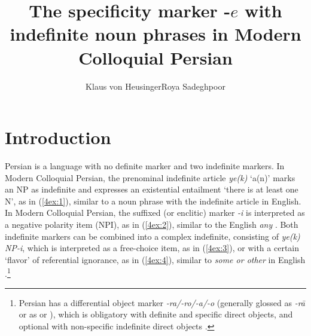 \documentclass[output=paper]{langsci/langscibook}
\author{Klaus von Heusinger\affiliation{Universität zu Köln}\lastand Roya Sadeghpoor\affiliation{Universität zu Köln}}
\title{The specificity marker -$e$ with indefinite noun phrases in Modern Colloquial Persian}
\begin{document}
\maketitle

\section{Introduction}
Persian is a language with no definite marker and two indefinite markers. In Modern Colloquial Persian, the prenominal indefinite article {\emph{ye(k)}} `a(n)' marks an NP as indefinite and expresses an existential entailment `there is at least one N', as in (\ref{4ex:1}), similar to a noun phrase with the indefinite article in English. In Modern Colloquial Persian, the suffixed (or enclitic) marker {\emph{-i}} is interpreted as a negative polarity item (NPI), as in (\ref{4ex:2}), similar to the English {\emph{any}} \citep{jasbi:14,lyons:99,windfuhr:79}. Both indefinite markers can be combined into a complex indefinite, consisting of {\emph{ye(k) NP-i}}, which is interpreted as a free-choice item, as in (\ref{4ex:3}), or with a certain `flavor' of referential ignorance, as in (\ref{4ex:4}), similar to {\emph{some or other}} in English \citep{jasbi:16}.\footnote{{Persian has a differential object marker {\emph{-ra/-ro/-a/-o}} (generally glossed as {\emph{-rā}} or as {} or {}), which is obligatory with definite and specific direct objects, and optional with non-specific indefinite direct objects \citep{ghomeshi:03,karimi:03,karimi:18, lazard:57,lazard:92,windfuhr:79}.}}
\end{document}
